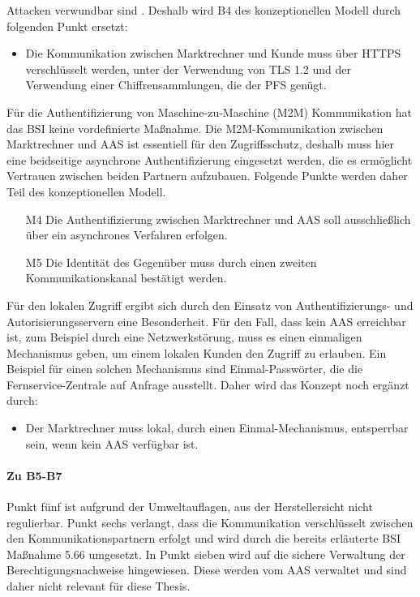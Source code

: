\documentclass[11pt,a4paper]{report}
\begin{document}
Attacken verwundbar sind \cite{ssl_lighttpd}. Deshalb wird B4 des konzeptionellen Modell durch folgenden Punkt ersetzt:

\begin{itemize}[leftmargin=*]
\item Die Kommunikation zwischen Marktrechner und Kunde muss über HTTPS verschlüsselt werden, unter der Verwendung von TLS 1.2 und der Verwendung einer Chiffrensammlungen, die der PFS genügt.
\end{itemize}

Für die Authentifizierung von Maschine-zu-Maschine (M2M) Kommunikation hat das BSI keine vordefinierte Maßnahme. Die M2M-Kommunikation zwischen Marktrechner und AAS ist essentiell für den Zugriffsschutz, deshalb muss hier eine beidseitige asynchrone Authentifizierung eingesetzt werden, die es ermöglicht Vertrauen zwischen beiden Partnern aufzubauen. Folgende Punkte werden daher Teil des konzeptionellen Modell.

\begin{itemize}[leftmargin=*]
\item[M4] Die Authentifizierung zwischen Marktrechner und AAS soll ausschließlich über ein asynchrones Verfahren erfolgen.
\item[M5] Die Identität des Gegenüber muss durch einen zweiten Kommunikationskanal bestätigt werden.
\end{itemize}

Für den lokalen Zugriff ergibt sich durch den Einsatz von Authentifizierungs- und Autorisierungsservern eine Besonderheit. Für den Fall, dass kein AAS erreichbar ist, zum Beispiel durch eine Netzwerkstörung, muss es einen einmaligen Mechanismus geben, um einem lokalen Kunden den Zugriff zu erlauben. Ein Beispiel für einen solchen Mechanismus sind Einmal-Passwörter, die die Fernservice-Zentrale auf Anfrage ausstellt. Daher wird das Konzept noch ergänzt durch:

\begin{itemize}[leftmargin=*]
\item Der Marktrechner muss lokal, durch einen Einmal-Mechanismus, entsperrbar sein, wenn kein AAS verfügbar ist.
\end{itemize}

\paragraph{Zu B5-B7} Punkt fünf ist aufgrund der Umweltauflagen, aus der Herstellersicht nicht regulierbar. Punkt sechs verlangt, dass die Kommunikation verschlüsselt zwischen den Kommunikationspartnern erfolgt und wird durch die bereits erläuterte BSI Maßnahme 5.66 umgesetzt. In Punkt sieben wird auf die sichere Verwaltung der Berechtigungsnachweise hingewiesen. Diese werden vom AAS verwaltet und sind daher nicht relevant für diese Thesis.
\end{document}
